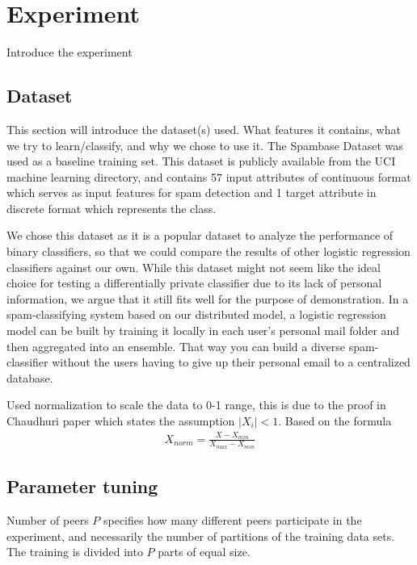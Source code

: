 
\chapter{Experiment}

Introduce the experiment

\section{Dataset}
This section will introduce the dataset(s) used. What features it contains, what we try to learn/classify, and why we chose to use it.
The Spambase Dataset \cite{spambase1999data} was used as a baseline training set. This dataset is publicly available from the UCI machine learning directory, and contains 57 input attributes of continuous format which serves as input features for spam detection and 1 target attribute in discrete format which represents the class.

We chose this dataset as it is a popular dataset to analyze the performance of binary classifiers, so that we could compare the results of other logistic regression classifiers against our own. While this dataset might not seem like the ideal choice for testing a differentially private classifier due to its lack of personal information, we argue that it still fits well for the purpose of demonstration. In a spam-classifying system based on our distributed model, a logistic regression model can be built by training it locally in each user's personal mail folder and then aggregated into an ensemble. That way you can build a diverse spam-classifier without the users having to give up their personal email to a centralized database.     

Used normalization to scale the data to 0-1 range, this is due to the proof in Chaudhuri paper which states the assumption $|X_i|< 1$. Based on the formula
\begin{eqnarray}
	X_{norm} = \frac{X-X_{min}}{X_{max} - X_{min}}
\end{eqnarray}

\section{Parameter tuning}

Number of peers $P$ specifies how many different peers participate in the experiment, and necessarily the number of partitions of the training data sets. The training is divided into $P$ parts of equal size.

